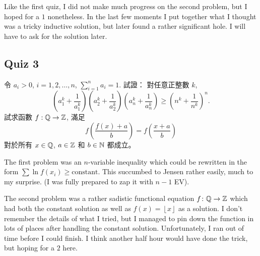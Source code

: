 \documentclass[11pt]{scrreprt}
\begin{document}
Like the first quiz, I did not make much progress on the second problem, but I hoped for a $1$ nonetheless.
In the last few moments I put together what I thought was a tricky inductive solution,
but later found a rather significant hole. I will have to ask for the solution later.

\subsection{Quiz 3}
\begin{enumerate}
  \ii 令 $a_i > 0$,  $i = 1,2,\dots,n$, $\sum_{i=1}^n a_i = 1$.
  試證： 對任意正整數 $k$,
  \[ \left( a_1^k + \frac{1}{a_1^k} \right) \left( a_2^k + \frac{1}{a_2^k} \right)\left( a_n^k + \frac{1}{a_n^k} \right) \ge \left( n^k + \frac{1}{n^k} \right)^n. \]
  \ii 試求函數 $f : \mathbb Q \to \mathbb Z$, 滿足
  \[ f\left( \frac{f(x)+a}{b} \right) = f\left( \frac{x+a}{b} \right) \]
  對於所有 $x \in \mathbb Q$, $a \in \mathbb Z$ 和 $b \in \mathbb N$ 都成立。 %
\end{enumerate}
The first problem was an $n$-variable inequality which could be rewritten in the
form $\sum \ln f(x_i) \ge \text{constant}$. This succumbed to Jensen rather easily, much to my surprise.
(I was fully prepared to zap it with $n-1$ EV).

The second problem was a rather sadistic functional equation
$f\colon \mathbb Q \to \mathbb Z$ which had both the constant solution as well as
$f(x) = \left\lfloor x \right\rfloor$ as a solution.
I don't remember the details of what I tried,
but I managed to pin down the function in lots of places after handling the constant solution.
Unfortunately, I ran out of time before I could finish.
I think another half hour would have done the trick, but hoping for a $2$ here.
\end{document}
